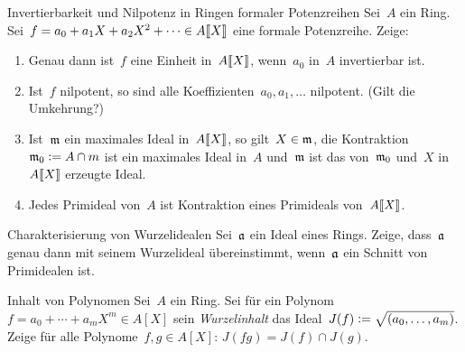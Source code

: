 \documentclass{uebblatt}
\begin{document}

\begin{aufgabe}{}{Invertierbarkeit und Nilpotenz in Ringen formaler Potenzreihen}
Sei~$A$ ein Ring. Sei~$f = a_0 + a_1 X + a_2 X^2 + \cdots \in
{A}\llbracket{X}\rrbracket$ eine formale Potenzreihe. Zeige:
\begin{enumerate}
\item Genau dann ist~$f$ eine Einheit in~${A}\llbracket{X}\rrbracket$, wenn~$a_0$ in~$A$ invertierbar
ist.
\item Ist~$f$ nilpotent, so sind alle Koeffizienten~$a_0,a_1,\ldots$ nilpotent.
(Gilt die Umkehrung?)
\item Ist~$\mathfrak{m}$ ein maximales Ideal in~${A}\llbracket{X}\rrbracket$, so gilt~$X \in \mathfrak{m}$, die
Kontraktion~$\mathfrak{m}_0 \vcentcolon= A \cap m$ ist ein maximales Ideal in~$A$ und~$\mathfrak{m}$
ist das von~$\mathfrak{m}_0$ und~$X$ in~${A}\llbracket{X}\rrbracket$ erzeugte Ideal.
\item Jedes Primideal von~$A$ ist Kontraktion eines Primideals von~${A}\llbracket{X}\rrbracket$.
\end{enumerate}
\end{aufgabe}

\begin{aufgabe}{}{Charakterisierung von Wurzelidealen}
Sei~$\mathfrak{a}$ ein Ideal eines Rings. Zeige, dass~$\mathfrak{a}$ genau dann mit
seinem Wurzelideal übereinstimmt, wenn~$\mathfrak{a}$ ein Schnitt von Primidealen ist.
\end{aufgabe}

\begin{aufgabe}{}{Inhalt von Polynomen}
Sei~$A$ ein Ring. Sei für ein Polynom~$f = a_0 + \cdots + a_m X^m \in A[X]$ sein
\emph{Wurzelinhalt} das Ideal~$J(f) \vcentcolon= \sqrt{(a_0,\ldots,a_m)}$. Zeige für
alle Polynome~$f, g \in A[X]$: $J(fg) = J(f) \cap J(g)$.
\end{aufgabe}
\end{document}
